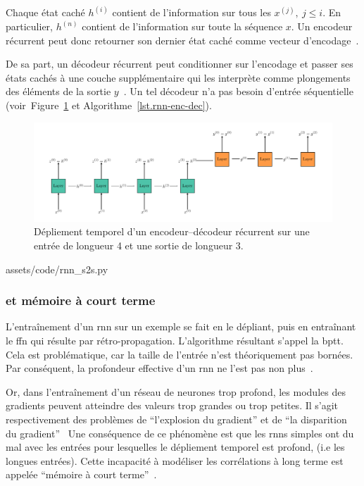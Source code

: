 Chaque état caché \(h^{(i)}\) contient de l'information sur tous les \(x^{(j)},\ j\le i\).
En particulier, \(h^{(n)}\) contient de l'information sur toute la séquence \(x\).
Un encodeur récurrent peut donc retourner son dernier état caché comme vecteur d'encodage~\cite{deep-nmt-survey}.

De sa part, un décodeur récurrent peut conditionner sur l'encodage 
et passer ses états cachés à une couche supplémentaire 
qui les interprète comme plongements des éléments de la sortie \(y\)~\cite{Fathi_2021}.
Un tel décodeur n'a pas besoin d'entrée séquentielle 
(voir~Figure~\ref{fig.rnn-enc-dec} et Algorithme~\ref{lst.rnn-enc-dec}).

\begin{figure}[hbt]
    \begin{center}
        \includegraphics[width=\textwidth]{assets/images/rnn-enc-dec.png}
    \end{center}
    
    \caption[Dépliement temporel d'un encodeur--décodeur récurrent.]
    {Dépliement temporel d'un encodeur--décodeur récurrent  
    sur une entrée de longueur 4 et une sortie de longueur 3.}
    \label{fig.rnn-enc-dec}
\end{figure}


{assets/code/rnn_s2s.py}

\subsubsection{ et mémoire à court terme}

L'entraînement d'un \gls{rnn} sur un exemple se fait en le dépliant, 
puis en entraînant le \gls{ffn} qui résulte par rétro-propagation.
L'algorithme résultant s'appel la \gls{bptt}.
Cela est problématique, car la taille de l'entrée n'est théoriquement pas bornées.
Par conséquent, la profondeur effective d'un \gls{rnn} ne l'est pas non plus~\cite{Fathi_2021}.

Or, dans l'entraînement d'un réseau de neurones trop profond,
les modules des gradients peuvent atteindre des valeurs trop grandes ou trop petites.
Il s'agit respectivement des problèmes de ``l'explosion du gradient'' 
et de ``la disparition du gradient''~\cite{Basodi_Ji_Zhang_Pan_2020}
Une conséquence de ce phénomène est que 
les \glspl{rnn} simples ont du mal avec les entrées pour lesquelles le dépliement temporel est profond,
(i.e les longues entrées).
Cette incapacité à modéliser les corrélations à long terme est appelée 
``mémoire à court terme''~\cite{Bengio_Simard_Frasconi_1994,Informatik_Bengio_Frasconi_Schmidhuber_2003}.


